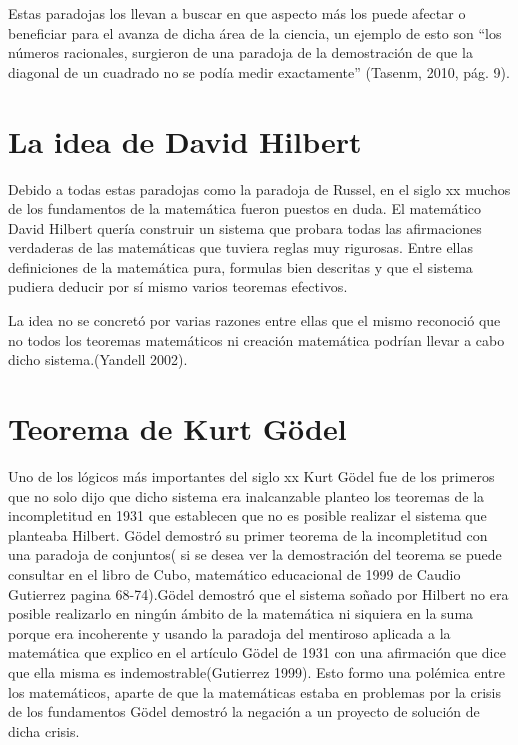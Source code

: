 \documentclass{article}
\begin{document}
\vspace{10pt}

Estas paradojas los llevan a buscar en que aspecto más los puede afectar o beneficiar para el avanza de dicha área de la ciencia, un ejemplo de esto son “los números racionales, surgieron de una paradoja de la demostración de  que la diagonal de un cuadrado no se podía medir exactamente” (Tasenm, 2010, pág. 9).
\vspace{10pt}

\section{La idea de David Hilbert}
Debido a todas estas paradojas como la paradoja de Russel, en el siglo xx muchos de los fundamentos de la matemática fueron puestos en duda. El matemático David Hilbert quería construir un sistema que probara todas las afirmaciones verdaderas  de las matemáticas que tuviera reglas muy rigurosas. Entre ellas definiciones de la matemática pura, formulas bien descritas y que el sistema pudiera deducir por sí mismo varios teoremas efectivos.

\vspace{10pt}

La idea no se concretó por varias razones entre ellas que el mismo reconoció que no todos los teoremas matemáticos ni creación matemática podrían llevar a cabo dicho sistema.(Yandell 2002).

\vspace{10pt}
\section{Teorema de Kurt Gödel}
Uno de los lógicos más importantes del siglo xx Kurt Gödel fue de los primeros que no solo dijo que dicho sistema era inalcanzable planteo los teoremas de la incompletitud en 1931 que establecen que no es posible realizar el sistema que planteaba Hilbert.
\vspace{10pt}
Gödel demostró su primer teorema de la incompletitud con una paradoja de conjuntos( si se desea ver la demostración del teorema se puede consultar en el libro de Cubo, matemático educacional de 1999 de Caudio Gutierrez pagina 68-74).Gödel demostró que el sistema soñado por Hilbert no era posible realizarlo en ningún ámbito de la matemática ni siquiera en la suma porque era incoherente y usando la paradoja  del mentiroso aplicada a la matemática que explico en el artículo Gödel de 1931 con una afirmación que dice que ella misma es indemostrable(Gutierrez  1999).
\vspace{10pt}
Esto formo una polémica entre los matemáticos, aparte de que la matemáticas estaba en problemas por la crisis de los fundamentos Gödel demostró la negación a un proyecto de solución de dicha crisis.
\end{document}
